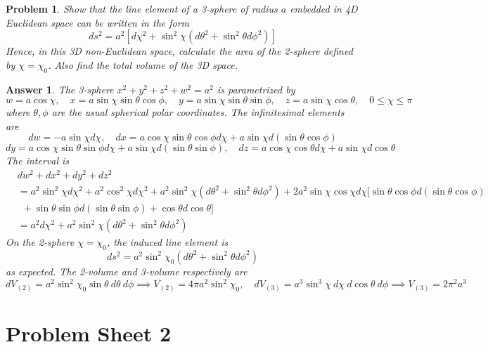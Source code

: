 \documentclass[a4paper]{article}
\newtheorem{ans}{Answer}[subsection]
\theoremstyle{new}
\newtheorem{qns}{Problem}[section]
\begin{document}
\begin{qns}
Show that the line element of a 3-sphere of radius $a$ embedded in 4D Euclidean space can be written in the form
$$ds^2=a^2[d\chi^2+\sin^2\chi(d\theta^2+\sin^2\theta d\phi^2)]$$
Hence, in this 3D non-Euclidean space, calculate the area of the 2-sphere defined by $\chi=\chi_0$. Also find the total volume of the 3D space.
\end{qns}
\begin{ans}
The 3-sphere $x^2+y^2+z^2+w^2=a^2$ is parametrized by
$$w=a\cos\chi,\quad x=a\sin\chi\sin\theta\cos\phi,\quad y=a\sin\chi\sin\theta\sin\phi,\quad z=a\sin\chi\cos\theta,\quad 0\leq\chi\leq\pi$$
where $\theta,\phi$ are the usual spherical polar coordinates. The infinitesimal elements are
$$dw=-a\sin\chi d\chi,\quad dx=a\cos\chi\sin\theta\cos\phi d\chi+a\sin\chi d(\sin\theta\cos\phi)$$
$$dy=a\cos\chi\sin\theta\sin\phi d\chi+a\sin\chi d(\sin\theta\sin\phi),\quad dz=a\cos\chi\cos\theta d\chi+a\sin\chi d\cos\theta$$
The interval is
\begin{align}
    &dw^2+dx^2+dy^2+dz^2\nonumber\\&=a^2\sin^2\chi d\chi^2+a^2\cos^2\chi d\chi^2+a^2\sin^2\chi(d\theta^2+\sin^2\theta d\phi^2)+2a^2\sin\chi\cos\chi d\chi[\sin\theta\cos\phi d(\sin\theta\cos\phi)\nonumber\\&~~+\sin\theta\sin\phi d(\sin\theta\sin\phi)+\cos\theta d\cos\theta]\nonumber\\&=a^2d\chi^2+a^2\sin^2\chi(d\theta^2+\sin^2\theta d\phi^2)\nonumber
\end{align}
On the 2-sphere $\chi=\chi_0$, the induced line element is
$$ds^2=a^2\sin^2\chi_0(d\theta^2+\sin^2\theta d\phi^2)$$
as expected. The 2-volume and 3-volume respectively are
$$dV_{(2)}=a^2\sin^2\chi_0\sin\theta~d\theta~d\phi\implies V_{(2)}=4\pi a^2\sin^2\chi_0,\quad dV_{(3)}=a^3\sin^3\chi~d\chi~d\cos\theta~d\phi\implies V_{(3)}=2\pi^2a^3$$
\end{ans}


\newpage
\section{Problem Sheet 2}
\end{document}

